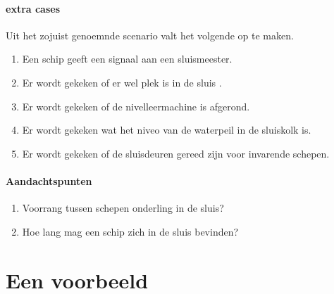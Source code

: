 \paragraph{extra cases}
Uit het zojuist genoemnde scenario valt het volgende op te maken.
\begin{enumerate}
	\item Een schip geeft een signaal aan een sluismeester.
	\item Er wordt gekeken of er wel plek is in de sluis .
	\item Er wordt gekeken of de nivelleermachine is afgerond.
	\item Er wordt gekeken wat het niveo van de waterpeil in de sluiskolk is.
	\item Er wordt gekeken of de sluisdeuren gereed zijn voor invarende schepen.
\end{enumerate}
\paragraph{Aandachtspunten}
\begin{enumerate}
	\item Voorrang tussen schepen onderling in de sluis?
	\item Hoe lang mag een schip zich in de sluis bevinden?
\end{enumerate} 

\section{Een voorbeeld}

